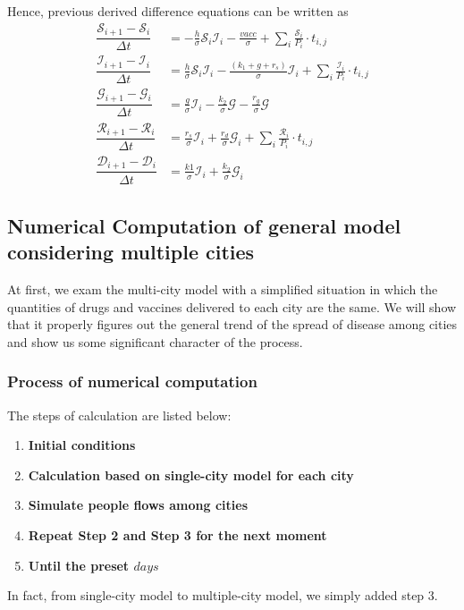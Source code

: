 Hence, previous derived difference equations can be written as
\begin{subequations}
	\begin{align}
		\dfrac{\mathcal{S}_{i+1} - \mathcal{S}_{i}}{\Delta t} & =-\frac{h}{\sigma}\mathcal{S}_i\mathcal{I}_i-\frac{vacc}{\sigma}+\sum_i \frac{\mathcal{S}_{i}}{P_{i}}\cdot t_{i,j}                    \\
		\dfrac{\mathcal{I}_{i+1} - \mathcal{I}_{i}}{\Delta t} & =\frac{h}{\sigma}\mathcal{S}_i\mathcal{I}_i-\frac{(k_1+g+r_s)}{\sigma}\mathcal{I}_i+\sum_i \frac{\mathcal{I}_{i}}{P_{i}}\cdot t_{i,j} \\
		\dfrac{\mathcal{G}_{i+1} - \mathcal{G}_{i}}{\Delta t} & =\frac{g}{\sigma}\mathcal{I}_i-\frac{k_2}{\sigma} \mathcal{G}-\frac{r_g}{\sigma} \mathcal{G}                                          \\
		\dfrac{\mathcal{R}_{i+1} - \mathcal{R}_{i}}{\Delta t} & =\frac{r_s}{\sigma}\mathcal{I}_i+\frac{r_d}{\sigma} \mathcal{G}_i+\sum_i \frac{\mathcal{R}_{i}}{P_{i}}\cdot t_{i,j}                   \\
		\dfrac{\mathcal{D}_{i+1} - \mathcal{D}_{i}}{\Delta t} & =\frac{k1}{\sigma}\mathcal{I}_i+\frac{k_2}{\sigma} \mathcal{G}_i
	\end{align}
\end{subequations}

\subsection{Numerical Computation of general model considering multiple cities}
At first, we exam the multi-city model with a simplified situation in which the quantities of drugs and vaccines delivered to each city are the same. We will show that it properly figures out the general trend of the spread of disease among cities and show us some significant character of the process.
\subsubsection{Process of numerical computation}
The steps of calculation are listed below:
\begin{enumerate}
	\item \textbf{Initial conditions}
	\item \textbf{Calculation based on single-city model for each city }
	\item \textbf{Simulate people flows among cities}
	\item \textbf{Repeat Step 2 and Step 3 for the next moment}
	\item \textbf{Until the preset $days$}
\end{enumerate}
In fact, from single-city model to multiple-city model, we simply added step 3.

